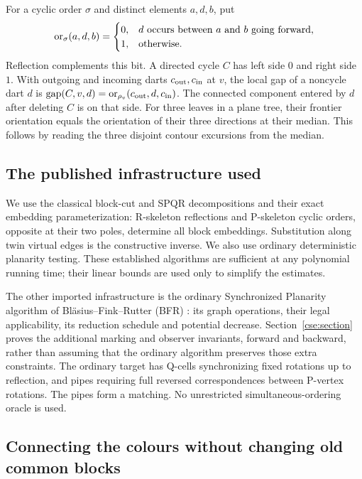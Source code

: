 For a cyclic order $\sigma$ and distinct elements $a,d,b$, put
\[
 \operatorname{or}_\sigma(a,d,b)=
 \begin{cases}0,&d\text{ occurs between }a\text{ and }b\text{ going forward},\\
 1,&\text{otherwise}.
 \end{cases}
\]
Reflection complements this bit. A directed cycle $C$ has left side $0$
and right side $1$. With outgoing and incoming darts $c_{\rm out},c_{\rm in}$
at $v$, the local gap of a noncycle dart $d$ is
$\operatorname{gap}(C,v,d)=\operatorname{or}_{\rho_v}(c_{\rm out},d,c_{\rm in})$.
The connected component entered by $d$ after deleting $C$ is on that side.
For three leaves in a plane tree, their frontier orientation equals the
orientation of their three directions at their median. This follows by
reading the three disjoint contour excursions from the median.

\subsection{The published infrastructure used}

We use the classical block-cut and SPQR decompositions and their exact
embedding parameterization: R-skeleton reflections and P-skeleton cyclic
orders, opposite at their two poles, determine all block embeddings.
Substitution along twin virtual edges is the constructive inverse. We also
use ordinary deterministic planarity testing. These established algorithms
are sufficient at any polynomial running time; their linear bounds are
used only to simplify the estimates.

The other imported infrastructure is the ordinary Synchronized Planarity
algorithm of Bl\"asius--Fink--Rutter (BFR) \cite{bfr}: its graph operations,
their legal applicability, its reduction schedule and potential decrease.
Section~\ref{cse:section} proves the additional marking and observer
invariants, forward and backward, rather than assuming that the ordinary
algorithm preserves those extra constraints. The ordinary target has
Q-cells synchronizing fixed rotations up to reflection, and pipes requiring
full reversed correspondences between P-vertex rotations. The pipes form
a matching. No unrestricted simultaneous-ordering oracle is used.

\subsection{Connecting the colours without changing old common blocks}

